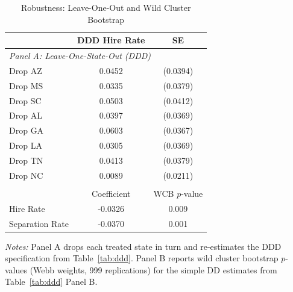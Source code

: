 \begin{table}[H]
\centering
\begin{threeparttable}
\caption{Robustness: Leave-One-Out and Wild Cluster Bootstrap}
\label{tab:robust}
\begin{tabular}{lcc}
\toprule
 & DDD Hire Rate & SE \\
\midrule
\multicolumn{3}{l}{\textit{Panel A: Leave-One-State-Out (DDD)}} \\
Drop AZ & 0.0452 & (0.0394) \\
Drop MS & 0.0335 & (0.0379) \\
Drop SC & 0.0503 & (0.0412) \\
Drop AL & 0.0397 & (0.0369) \\
Drop GA & 0.0603 & (0.0367) \\
Drop LA & 0.0305 & (0.0369) \\
Drop TN & 0.0413 & (0.0379) \\
Drop NC & 0.0089 & (0.0211) \\
\addlinespace
\multicolumn{3}{l}{\textit{Panel B: Wild Cluster Bootstrap (Hispanic Construction DD)}} \\
 & Coefficient & WCB $p$-value \\
Hire Rate & -0.0326 & 0.009 \\
Separation Rate & -0.0370 & 0.001 \\
\bottomrule
\end{tabular}
\begin{tablenotes}[flushleft]\footnotesize
\item \textit{Notes:} Panel A drops each treated state in turn and re-estimates the DDD specification from Table~\ref{tab:ddd}. Panel B reports wild cluster bootstrap $p$-values (Webb weights, 999 replications) for the simple DD estimates from Table~\ref{tab:ddd} Panel B.
\end{tablenotes}
\end{threeparttable}
\end{table}
